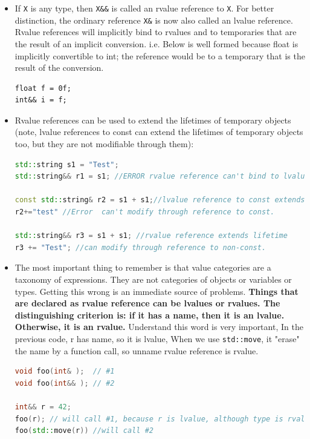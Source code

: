 \documentclass[a4paper,11pt,twoside]{book}
\begin{document}
\begin{itemize}
	\item If \texttt{X} is any type, then \texttt{X\&\&} is called an rvalue reference to \texttt{X}. For better distinction, the ordinary reference \texttt{X\&} is now also called an lvalue reference. Rvalue references will implicitly bind to rvalues and to temporaries that are the result of an implicit conversion. i.e. Below is well formed because float is implicitly convertible to int; the reference would be to a temporary that is the result of the conversion.
\begin{lstlisting}
float f = 0f; 
int&& i = f; 
\end{lstlisting}
	
	\item Rvalue references can be used to extend the lifetimes of temporary objects (note, lvalue references to const can extend the lifetimes of temporary objects too, but they are not modifiable through them):
	
\begin{lstlisting}[frame=single, language=c++, mathescape=true]
std::string s1 = "Test";
std::string&& r1 = s1; //ERROR rvalue reference can't bind to lvalue.
		
const std::string& r2 = s1 + s1;//lvalue reference to const extends lifetime. 
r2+="test" //Error  can't modify through reference to const.
		
std::string&& r3 = s1 + s1; //rvalue reference extends lifetime
r3 += "Test"; //can modify through reference to non-const.                   
\end{lstlisting}
	

	\item The most important thing to remember is that value categories are a taxonomy of expressions. They are not categories of objects or variables or types. Getting this wrong is an immediate source of problems. \textbf{Things that are declared as rvalue reference can be lvalues or rvalues. The distinguishing criterion is: if it has a name, then it is an lvalue. Otherwise, it is an rvalue.} Understand this word is very important, In the previous code, r has name, so it is lvalue, When we use \texttt{std::move}, it "erase" the name by a function call, so unname rvalue reference is rvalue.
	
\begin{lstlisting}[frame=single, language=c++, mathescape=true]
void foo(int& );  // #1
void foo(int&& ); // #2

int&& r = 42;
foo(r); // will call #1, because r is lvalue, although type is rvalue reference.
foo(std::move(r)) //will call #2
\end{lstlisting} 


\end{itemize}
\end{document}
